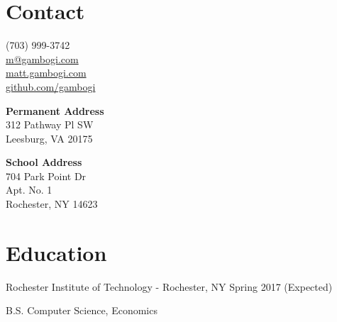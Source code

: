 \documentclass[letter,margin,line]{resume}
\newcommand{\rdate}[1]{\hfill {\small #1}}
\begin{document}
    \begin{resume}
        \section{\mysidestyle Contact} \vspace{2mm}

        \begin{multicols}{3}
                  (703) 999-3742 \\
                  \href{mailto:m@gambogi.com}{m@gambogi.com} \\
                  \href{matt.gambogi.com}{matt.gambogi.com} \\
                  \href{github.com/gambogi}{github.com/gambogi}

            \columnbreak
            {\bf Permanent Address} \\
                  312 Pathway Pl SW \\
                  Leesburg, VA 20175

            \columnbreak
            {\bf School Address} \\
                   704 Park Point Dr \\
                   Apt. No. 1 \\
                   Rochester, NY 14623 

        \end{multicols}
        \section{\mysidestyle Education}
        \begin{compactdesc}
        \item[Rochester Institute of Technology] - Rochester, NY
            \rdate{Spring 2017 (Expected)}
        \item B.S. Computer Science, Economics
        \end{compactdesc}


\end{resume}
\end{document}

